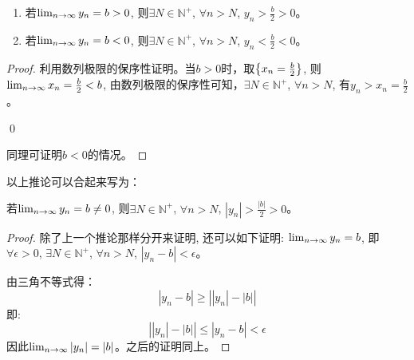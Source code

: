 \begin{lemma}
    \begin{enumerate}
        \item 若$\lim_{n \to \infty } y_n = b > 0$, 则$\exists N \in \mathbb{N}^+$, $\forall n > N$, $y_n > \frac{b}{2} > 0 $。
        \item 若$\lim_{n \to \infty } y_n = b < 0$, 则$\exists N \in \mathbb{N}^+$, $\forall n > N$, $y_n < \frac{b}{2} < 0 $。
    \end{enumerate}
\end{lemma}
\begin{proof}
    利用数列极限的保序性证明。当$b > 0$时，取$\left\{ x_n = \frac{b}{2}\right\}$, 则$\lim_{n \to \infty } x_n = \frac{b}{2} < b$, 由数列极限的保序性可知，$\exists N \in \mathbb{N}^+$, $\forall n > N$, 有$y_n > x_n = \frac{b}{2}$。 
    
    \qed

    同理可证明$b < 0$的情况。
\end{proof}
以上推论可以合起来写为：
\begin{lemma}\label{lemma:progression-order-b}
    若$\lim_{n \to \infty } y_n = b \neq 0$, 则$\exists N \in \mathbb{N}^+$, $\forall n > N$, $\left| y_n \right|> \frac{\left| b \right|}{2} > 0 $。
\end{lemma}
\begin{proof}
    除了上一个推论那样分开来证明, 还可以如下证明:
    $\lim_{n \to \infty } y_n = b$, 即$\forall \epsilon > 0$, $\exists N \in \mathbb{N}^+$, $\forall n > N$, $\left| y_n - b\right| < \epsilon$。

    由三角不等式得：
    \begin{equation*}
        \left| y_n - b\right| \ge \left| \left| y_n \right| - \left| b \right| \right|
    \end{equation*}
    即:
    \begin{equation*}
        \left| \left| y_n \right| - \left| b \right| \right| \le \left| y_n - b\right| < \epsilon
    \end{equation*}
    因此$\lim_{n \to \infty } \left| y_n \right| = \left| b \right|$。之后的证明同上。
\end{proof}

